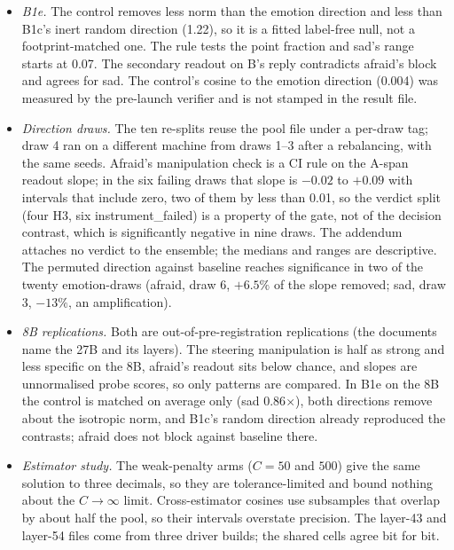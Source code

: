 \documentclass[11pt]{article}
\newcommand{\rid}[1]{{\footnotesize\texttt{#1}}}
\begin{document}
\begin{itemize}
\item \emph{B1e.} The control removes less norm than the emotion direction and less than B1c's inert random direction (1.22), so it is a fitted label-free null, not a footprint-matched one. The rule tests the point fraction and sad's range starts at 0.07. The secondary readout on B's reply contradicts afraid's block and agrees for sad. The control's cosine to the emotion direction (0.004) was measured by the pre-launch verifier and is not stamped in the result file.
\item \emph{Direction draws.} The ten re-splits reuse the pool file under a per-draw tag; draw 4 ran on a different machine from draws 1--3 after a rebalancing, with the same seeds. Afraid's manipulation check is a CI rule on the A-span readout slope; in the six failing draws that slope is $-0.02$ to $+0.09$ with intervals that include zero, two of them by less than 0.01, so the verdict split (four H3, six instrument\_failed) is a property of the gate, not of the decision contrast, which is significantly negative in nine draws. The addendum attaches no verdict to the ensemble; the medians and ranges are descriptive. The permuted direction against baseline reaches significance in two of the twenty emotion-draws (afraid, draw 6, $+6.5\%$ of the slope removed; sad, draw 3, $-13\%$, an amplification).
\item \emph{8B replications.} Both are out-of-pre-registration replications (the documents name the 27B and its layers). The steering manipulation is half as strong and less specific on the 8B, afraid's readout sits below chance, and slopes are unnormalised probe scores, so only patterns are compared. In B1e on the 8B the control is matched on average only (sad 0.86$\times$), both directions remove about the isotropic norm, and B1c's random direction already reproduced the contrasts; afraid does not block against baseline there.
\item \emph{Estimator study.} The weak-penalty arms ($C = 50$ and $500$) give the same solution to three decimals, so they are tolerance-limited and bound nothing about the $C \to \infty$ limit. Cross-estimator cosines use subsamples that overlap by about half the pool, so their intervals overstate precision. The layer-43 and layer-54 files come from three driver builds; the shared cells agree bit for bit.
\end{itemize}

\begin{table}[H]\centering\footnotesize
\caption{Direction-resampling draws (PREREG\_B1e addendum 3): blocked fractions of the none-arm slope for afraid and sad in ten re-splits of the probe pool (split seeds 1--10; ``Draw 0'' is the run in Table~\ref{tab:decision}), with the median and range across draws, the number of draws whose contrast's unadjusted scenario-bootstrap CI lies below zero (the draws ran two emotions, so no five-emotion family exists; no adjustment is applied), and the number of draws in which the emotion's manipulation check (the A-span readout responds to A's own steering) passes (\rid{b1e10.*}).}
\label{tab:draws}

\end{table}
\end{document}
